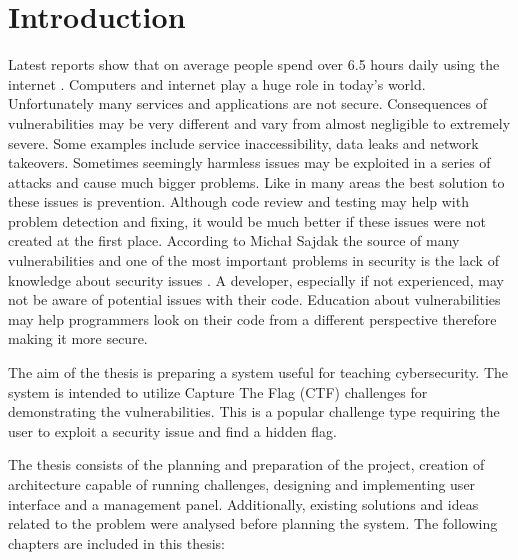 \chapter{Introduction}

Latest reports show that on average people spend over 6.5 hours daily using the internet \cite{bib:digital-2023}. Computers and internet play a huge role in today's world. Unfortunately many services and applications are not secure. Consequences of vulnerabilities may be very different and vary from almost negligible to extremely severe. Some examples include service inaccessibility, data leaks and network takeovers. Sometimes seemingly harmless issues may be exploited in a series of attacks and cause much bigger problems. Like in many areas the best solution to these issues is prevention. Although code review and testing may help with problem detection and fixing, it would be much better if these issues were not created at the first place. According to Michał Sajdak the source of many vulnerabilities and one of the most important problems in security is the lack of knowledge about security issues \cite{bib:securitum-wstep}. A developer, especially if not experienced, may not be aware of potential issues with their code. Education about vulnerabilities may help programmers look on their code from a different perspective therefore making it more secure.

The aim of the thesis is preparing a system useful for teaching cybersecurity. The system is intended to utilize Capture The Flag (CTF) challenges for demonstrating the vulnerabilities. This is a popular challenge type requiring the user to exploit a security issue and find a hidden flag.

The thesis consists of the planning and preparation of the project, creation of architecture capable of running challenges, designing and implementing user interface and a management panel. Additionally, existing solutions and ideas related to the problem were analysed before planning the system. The following chapters are included in this thesis:

